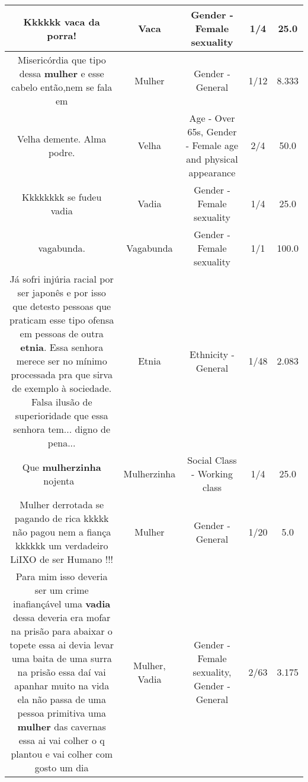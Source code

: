 \documentclass[11pt]{article}
\newlength\mylength
\begin{document}
\begin{center}
\begin{longtable}{|C{.65\mylength}|C{.30\mylength}|C{.12\mylength}|C{.12\mylength}|C{.12\mylength}|}
  \small Kkkkkk \textbf{vaca} da porra!\normalsize   & Vaca & Gender - Female sexuality & 1/4 & 25.0 \\  \hline
  \small Misericórdia que tipo dessa \textbf{mulher} e esse cabelo então,nem se fala em\normalsize   & Mulher & Gender - General & 1/12 & 8.333 \\  \hline
  \small Velha demente. Alma podre.\normalsize   & Velha & Age - Over 65s, Gender - Female age and physical appearance & 2/4 & 50.0 \\  \hline
  \small Kkkkkkkk se fudeu vadia\normalsize   & Vadia & Gender - Female sexuality & 1/4 & 25.0 \\  \hline
  \small vagabunda.\normalsize   & Vagabunda & Gender - Female sexuality & 1/1 & 100.0 \\  \hline
  \small Já sofri injúria racial por ser japonês e por isso que detesto pessoas que praticam esse tipo ofensa em pessoas de outra \textbf{etnia}. Essa senhora merece ser no mínimo processada pra que sirva de exemplo à sociedade. Falsa ilusão de superioridade que essa senhora tem... digno de pena...\normalsize   & Etnia & Ethnicity - General & 1/48 & 2.083 \\  \hline
  \small Que \textbf{mulherzinha} nojenta 🤮\normalsize   & Mulherzinha & Social Class - Working class & 1/4 & 25.0 \\  \hline
  \small Mulher derrotada se pagando de rica kkkkk não pagou nem a fiança kkkkkk um verdadeiro LiIXO de ser Humano !!!\normalsize   & Mulher & Gender - General & 1/20 & 5.0 \\  \hline
  \small Para mim isso deveria ser um crime inafiançável uma \textbf{vadia} dessa deveria era mofar na prisão para abaixar o topete essa ai devia levar uma baita de uma surra na prisão essa daí vai apanhar muito na vida ela não passa de uma pessoa primitiva uma \textbf{mulher} das cavernas essa ai vai colher o q plantou e vai colher com gosto um dia\normalsize   & Mulher, Vadia & Gender - Female sexuality, Gender - General & 2/63 & 3.175 \\  \hline

\end{longtable}
\end{center}
\end{document}
